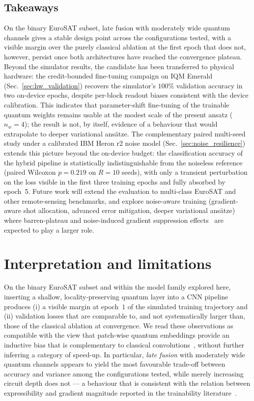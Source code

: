 \subsection{Takeaways}
On the binary EuroSAT subset, late fusion with moderately wide quantum channels gives a stable design point across the configurations tested, with a visible margin over the purely classical ablation at the first epoch that does not, however, persist once both architectures have reached the convergence plateau. Beyond the simulator results, the candidate has been transferred to physical hardware: the credit-bounded fine-tuning campaign on IQM Emerald (Sec.~\ref{sec:hw_validation}) recovers the simulator's $100\%$ validation accuracy in two on-device epochs, despite per-block readout biases consistent with the device calibration. This indicates that parameter-shift fine-tuning of the trainable quantum weights remains usable at the modest scale of the present ansatz ($n_w=4$); the result is not, by itself, evidence of a behaviour that would extrapolate to deeper variational ansätze. The complementary paired multi-seed study under a calibrated IBM Heron r2 noise model (Sec.~\ref{sec:noise_resilience}) extends this picture beyond the on-device budget: the classification accuracy of the hybrid pipeline is statistically indistinguishable from the noiseless reference (paired Wilcoxon $p=0.219$ on $R=10$ seeds), with only a transient perturbation on the loss visible in the first three training epochs and fully absorbed by epoch~5. Future work will extend the evaluation to multi-class EuroSAT and other remote-sensing benchmarks, and explore noise-aware training (gradient-aware shot allocation, advanced error mitigation, deeper variational ansätze) where barren-plateau and noise-induced gradient suppression effects~\cite{McClean2018,Holmes2022PRXQ,Wang2021NoiseInducedBP} are expected to play a larger role.

\section{Interpretation and limitations}
\label{sec:discussion}
On the binary EuroSAT subset and within the model family explored here, inserting a shallow, locality-preserving quantum layer into a CNN pipeline produces (i) a visible margin at epoch~$1$ of the simulated training trajectory and (ii) validation losses that are comparable to, and not systematically larger than, those of the classical ablation at convergence. We read these observations as compatible with the view that patch-wise quantum embeddings provide an inductive bias that is complementary to classical convolutions~\cite{Havlicek2019,Schuld2019PRA,Cong2019}, without further inferring a category of speed-up. In particular, \emph{late fusion} with moderately wide quantum channels appears to yield the most favourable trade-off between accuracy and variance among the configurations tested, while merely increasing circuit depth does not — a behaviour that is consistent with the relation between expressibility and gradient magnitude reported in the trainability literature~\cite{Holmes2022PRXQ,cerezo2021}.

